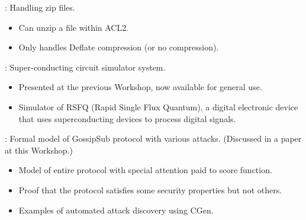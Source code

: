 
\begin{frame}

\newlibtitle

:
Handling zip files.
\begin{itemize}
\item Can unzip a file within ACL2.
\item Only handles Deflate compression (or no compression).
\end{itemize}

\end{frame}


\begin{frame}

\newlibtitle

:
Super-conducting circuit simulator system.
\begin{itemize}
\item Presented at the previous Workshop, now available for general use.
\item Simulator of RSFQ (Rapid Single Flux Quantum),
      a digital electronic device that uses superconducting devices
      to process digital signals.
\end{itemize}

\end{frame}


\begin{frame}

\newlibtitle

:
Formal model of GossipSub protocol with various attacks.
(Discussed in a paper at this Workshop.)
\begin{itemize}
\item Model of entire protocol with special attention paid to score function.
\item Proof that the protocol satisfies some security properties but not others.
\item Examples of automated attack discovery using CGen.
\end{itemize}

\end{frame}

